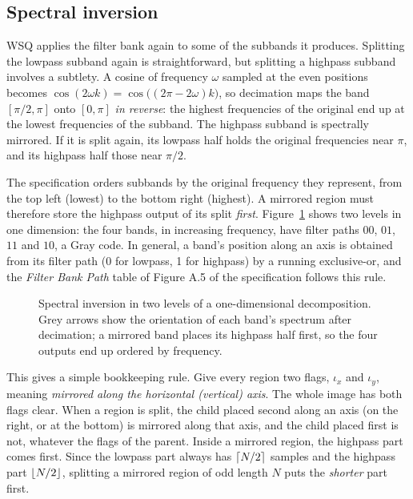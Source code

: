 \subsection{Spectral inversion}
\label{sec:inversion}

WSQ applies the filter bank again to some of the subbands it produces. Splitting the lowpass
subband again is straightforward, but splitting a highpass subband involves a subtlety. A
cosine of frequency $\omega$ sampled at the even positions becomes
$\cos(2\omega k) = \cos\bigl((2\pi - 2\omega)k\bigr)$, so decimation maps the band
$[\pi/2, \pi]$ onto $[0, \pi]$ \emph{in reverse}: the highest frequencies of the original end up
at the lowest frequencies of the subband. The highpass subband is spectrally mirrored.
If it is split again, its lowpass half holds the original frequencies near $\pi$, and its
highpass half those near $\pi/2$.

The specification orders subbands by the original frequency they represent, from the top left
(lowest) to the bottom right (highest). A mirrored region must therefore store the highpass
output of its split \emph{first}. Figure~\ref{fig:inversion} shows two levels in one
dimension: the four bands, in increasing frequency, have filter paths $00$, $01$, $11$ and $10$,
a Gray code. In general, a band's position along an axis is obtained from its filter path
(0 for lowpass, 1 for highpass) by a running exclusive-or, and the
\emph{Filter Bank Path} table of Figure A.5 of the specification follows this rule.

\begin{figure}[ht]
  \centering
  
  \caption{Spectral inversion in two levels of a one-dimensional decomposition. Grey arrows
  show the orientation of each band's spectrum after decimation; a mirrored band places its
  highpass half first, so the four outputs end up ordered by frequency.}
  \label{fig:inversion}
\end{figure}

This gives a simple bookkeeping rule. Give every region two flags, $\iota_x$ and $\iota_y$,
meaning \emph{mirrored along the horizontal (vertical) axis}. The whole image has both flags
clear. When a region is split, the child placed second along an axis (on the right, or at the
bottom) is mirrored along that axis, and the child placed first is not, whatever the flags of
the parent. Inside a mirrored region, the highpass part comes first. Since the lowpass part
always has $\lceil N/2 \rceil$ samples and the highpass part $\lfloor N/2 \rfloor$, splitting a mirrored
region of odd length $N$ puts the \emph{shorter} part first.

